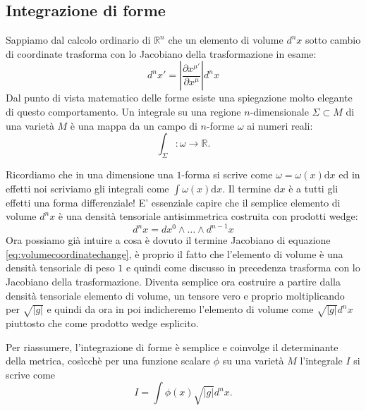 \documentclass[twoside]{article}
\begin{document}
\subsection{Integrazione di forme}
Sappiamo dal calcolo ordinario di $\mathbb{R}^n$ che un elemento di volume $d^n x$ sotto cambio di coordinate trasforma con lo Jacobiano della trasformazione in esame:
\begin{equation}\label{eq:volumecoordinatechange}
d^n x' = \left| \frac{\partial x^{\mu'}}{\partial x^\mu} \right | d^n x
\end{equation}
Dal punto di vista matematico delle forme esiste una spiegazione molto elegante di questo comportamento.
Un integrale su una regione $n$-dimensionale $\Sigma \subset M$ di una varietà $M$ è una mappa da un campo di $n$-forme $\omega$ ai numeri reali:
\begin{equation}\label{eq:integralasforms}
	\int_{\Sigma} : \omega \rightarrow \mathbb{R}.
\end{equation}

Ricordiamo che in una dimensione una $1$-forma si scrive come $\omega = \omega(x) \textrm{d}x$ ed in effetti noi scriviamo gli integrali come $\int \omega(x)\textrm{d}x$. Il termine $\textrm{d}x$ è a tutti gli effetti una forma differenziale! E' essenziale capire che il semplice elemento di volume $d^nx$ è una densità tensoriale antisimmetrica costruita con prodotti wedge:
\begin{equation}\label{eq:volumeform}
d^n x = dx^0 \wedge \ldots \wedge d^{n-1}x
\end{equation}
Ora possiamo già intuire a cosa è dovuto il termine Jacobiano di equazione \ref{eq:volumecoordinatechange}, è proprio il fatto che l'elemento di volume è una densità tensoriale di peso $1$ e quindi come discusso in precedenza trasforma con lo Jacobiano della trasformazione. Diventa semplice ora costruire a partire dalla densità tensoriale elemento di volume, un tensore vero e proprio moltiplicando per $\sqrt{|g|}$ e quindi da ora in poi indicheremo l'elemento di volume come $\sqrt{|g|}d^nx $ piuttosto che come prodotto wedge esplicito.

Per riassumere, l'integrazione di forme è semplice e coinvolge il determinante della metrica, cosìcchè per una funzione scalare $\phi$ su una varietà $M$ l'integrale $I$ si scrive come
\begin{equation}\label{eq:integralonmanifold}
	\boxed{ I = \int \phi(x)\sqrt{|g|} d^nx.}
\end{equation}
\end{document}
